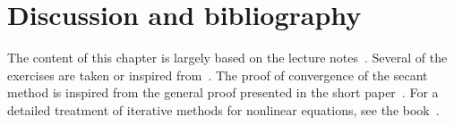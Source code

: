 \section{Discussion and bibliography}

The content of this chapter is largely based on the lecture notes~\cite{VanDooren}.
Several of the exercises are taken or inspired from~\cite{Legat}.
The proof of convergence of the secant method is inspired from the general proof presented in the short paper~\cite{MR1186462}.
For a detailed treatment of iterative methods for nonlinear equations,
see the book~\cite{MR1744713}.
